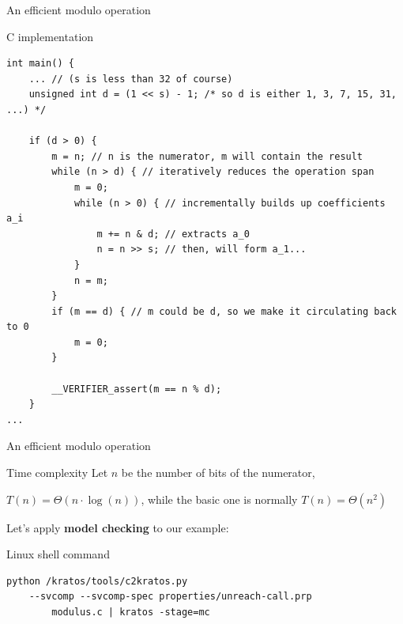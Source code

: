 \documentclass[aspectratio=1610,10.5pt]{beamer} %
\begin{document}
\begin{frame}[fragile]{An efficient modulo operation}
    \begin{block}{C implementation}
            \begin{verbatim}
int main() {
    ... // (s is less than 32 of course)
    unsigned int d = (1 << s) - 1; /* so d is either 1, 3, 7, 15, 31, ...) */

    if (d > 0) {
        m = n; // n is the numerator, m will contain the result
        while (n > d) { // iteratively reduces the operation span
            m = 0;
            while (n > 0) { // incrementally builds up coefficients a_i
                m += n & d; // extracts a_0
                n = n >> s; // then, will form a_1...
            }
            n = m;
        }
        if (m == d) { // m could be d, so we make it circulating back to 0
            m = 0;
        }

        __VERIFIER_assert(m == n % d);
    }
...
            \end{verbatim}
    \end{block}
\end{frame}

\begin{frame}[fragile]{An efficient modulo operation}
    \begin{block}{Time complexity}
        Let $n$ be the number of bits of the numerator,

        \medskip

        $T(n) = \Theta(n\cdot \log(n))$, while the basic one is normally $T(n) = \Theta(n^2)$
    \end{block}

    \bigskip

    \pause

    Let's apply \textbf{model checking} to our example:

    \begin{block}{Linux shell command}
            \begin{verbatim}
python /kratos/tools/c2kratos.py
    --svcomp --svcomp-spec properties/unreach-call.prp
        modulus.c | kratos -stage=mc
            \end{verbatim}
    \end{block}
\end{frame}
\end{document}
